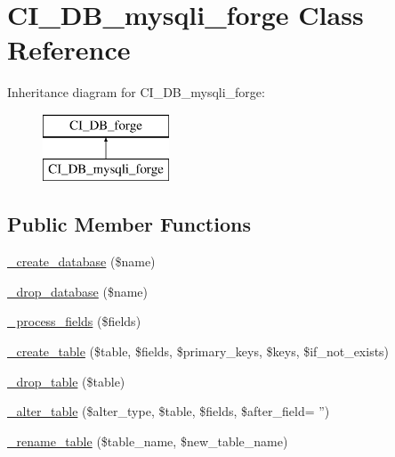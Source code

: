 \hypertarget{class_c_i___d_b__mysqli__forge}{\section{C\-I\-\_\-\-D\-B\-\_\-mysqli\-\_\-forge Class Reference}
\label{class_c_i___d_b__mysqli__forge}
}
Inheritance diagram for C\-I\-\_\-\-D\-B\-\_\-mysqli\-\_\-forge\-:\begin{figure}[H]
\begin{center}
\leavevmode
\includegraphics[height=2.000000cm]{class_c_i___d_b__mysqli__forge}
\end{center}
\end{figure}
\subsection*{Public Member Functions}
\begin{DoxyCompactItemize}
\item 
\hyperlink{class_c_i___d_b__mysqli__forge_ac70184ae4a86e97f324daa1901b78777}{\-\_\-create\-\_\-database} (\$name)
\item 
\hyperlink{class_c_i___d_b__mysqli__forge_a6e04d0af5e8e1e1f93f42d63f0744bfd}{\-\_\-drop\-\_\-database} (\$name)
\item 
\hyperlink{class_c_i___d_b__mysqli__forge_a338a54bfecc1fbfbe863e980cc8a5d44}{\-\_\-process\-\_\-fields} (\$fields)
\item 
\hyperlink{class_c_i___d_b__mysqli__forge_a99d4c17257f468337344690dd590582b}{\-\_\-create\-\_\-table} (\$table, \$fields, \$primary\-\_\-keys, \$keys, \$if\-\_\-not\-\_\-exists)
\item 
\hyperlink{class_c_i___d_b__mysqli__forge_a147efb0d859b7cf4148ff75642515231}{\-\_\-drop\-\_\-table} (\$table)
\item 
\hyperlink{class_c_i___d_b__mysqli__forge_a5aa3b886f51adfe92fc6abf6261ff881}{\-\_\-alter\-\_\-table} (\$alter\-\_\-type, \$table, \$fields, \$after\-\_\-field= '')
\item 
\hyperlink{class_c_i___d_b__mysqli__forge_aec593ba62c6ff875cafeac16b1c54ae6}{\-\_\-rename\-\_\-table} (\$table\-\_\-name, \$new\-\_\-table\-\_\-name)
\end{DoxyCompactItemize}
